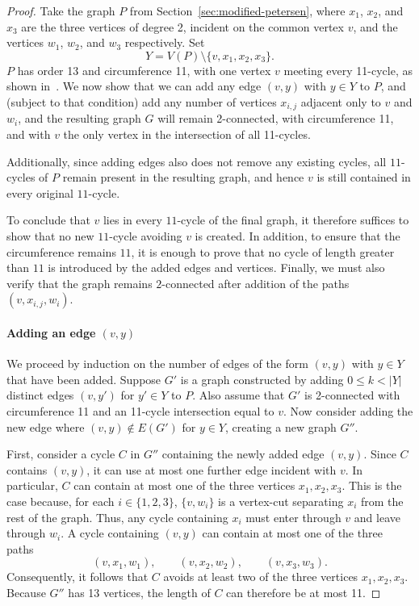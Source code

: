 \begin{proof}
Take the graph $P$ from Section~\ref{sec:modified-petersen}, where $x_1$, $x_2$, and $x_3$ are the three vertices of degree 2, incident on the common vertex $v$, and the vertices $w_1$, $w_2$, and $w_3$ respectively. Set 
$$
Y = V(P) \setminus \{v, x_1, x_2, x_3\}.
$$
$P$ has order 13 and circumference 11, with one vertex $v$ meeting every 11-cycle, as shown in~\cite{article:zamfirescu}. We now show that we can add any edge $(v,y)$ with $y \in Y$ to $P$, and (subject to that condition) add any number of vertices $x_{i,j}$ adjacent only to $v$ and $w_i$, and the resulting graph $G$ will remain 2-connected, with circumference 11, and with $v$ the only vertex in the intersection of all 11-cycles.

Additionally, since adding edges also does not remove any existing cycles, all $11$-cycles of $P$ remain present in the resulting graph, and hence $v$ is still contained in every original $11$-cycle.

To conclude that $v$ lies in every $11$-cycle of the final graph, it therefore suffices to show that no new $11$-cycle avoiding $v$ is created. In addition, to ensure that the circumference remains $11$, it is enough to prove that no cycle of length greater than $11$ is introduced by the added edges and vertices. Finally, we must also verify that the graph remains $2$-connected after addition of the paths $(v, x_{i,j}, w_i)$.

\paragraph{Adding an edge $(v,y)$}
We proceed by induction on the number of edges of the form $(v,y)$ with $y\in Y$ that have been added. Suppose $G'$ is a graph constructed by adding $0 \le k < |Y|$ distinct edges $(v,y')$ for $y' \in Y$ to $P$. Also assume that $G'$ is 2-connected with circumference 11 and an 11-cycle intersection equal to ${v}$. Now consider adding the new edge where $(v,y)\notin E(G')$ for $y \in Y$, creating a new graph $G''$.

First, consider a cycle $C$ in $G''$ containing the newly added edge $(v,y)$. Since $C$ contains $(v,y)$, it can use at most one further edge incident with $v$. In particular, $C$ can contain at most one of the three vertices $x_1,x_2,x_3$. This is the case because, for each $i\in\{1,2,3\}$, $\{v,w_i\}$ is a vertex-cut separating $x_i$ from the rest of the graph. Thus, any cycle containing $x_i$ must enter through $v$ and leave through $w_i$. A cycle containing $(v,y)$ can contain at most one of the three paths
\[
(v,x_1,w_1),\qquad (v,x_2,w_2),\qquad (v,x_3,w_3).
\]
Consequently, it follows that $C$ avoids at least two of the three vertices $x_1,x_2,x_3$. Because $G''$ has 13 vertices, the length of $C$ can therefore be at most 11.


\end{proof}
